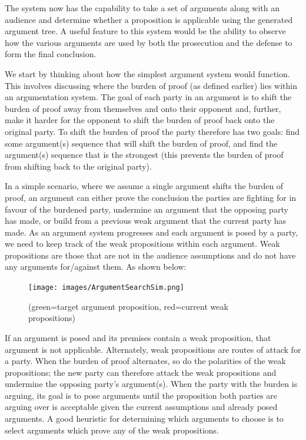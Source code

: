 \documentclass[10pt,a4paper,twocolumn]{article}
\begin{document}
The system now has the capability to take a set of arguments along with an audience and
determine whether a proposition is applicable using the generated argument tree.
A useful feature to this system would be the ability to observe how the various
arguments are used by both the prosecution and the defense to form the final
conclusion.

We start by thinking about how the simplest argument system would function. This
involves discussing where the burden of proof (as defined earlier) lies within an argumentation
system. The goal of each party in an argument is to shift the burden of proof
away from themselves and onto their opponent and, further, make it harder for
the opponent to shift the burden of proof back onto the original party. To
shift the burden of proof the party therefore has two goals: find some
argument(s) sequence that will shift the burden of proof, and find the
argument(s) sequence that is the strongest (this prevents the burden of proof
from shifting back to the original party). 

In a simple scenario, where we assume a single argument shifts the burden of
proof, an argument can either prove the conclusion the parties are fighting for
in favour of the burdened party, undermine an argument that the opposing party
has made, or build from a previous weak argument that the current party has
made. As an argument system progresses and each argument is posed by a party, we
need to keep track of the weak propositions within each argument. Weak
propositions are those that are not in the audience assumptions and do not have
any arguments for/against them. As shown below:

\begin{figure}[h]
  \texttt{[image: images/ArgumentSearchSim.png]}
  \centering
  \caption{(green=target argument proposition, red=current weak
  propositions)}

\end{figure}

If an argument is posed and its premises contain
a weak proposition, that argument is not applicable. Alternately, weak
propositions are routes of attack for a party. When the burden of proof
alternates, so do the polarities of the weak propositions; the new party can
therefore attack the weak propositions and undermine the opposing party's
argument(s). When the party with the burden is arguing, its goal is to pose
arguments until the proposition both parties are arguing over is acceptable
given the current
assumptions and already posed arguments. A good heuristic for determining which
arguments to choose is to select arguments which prove any of the weak
propositions.
\end{document}
